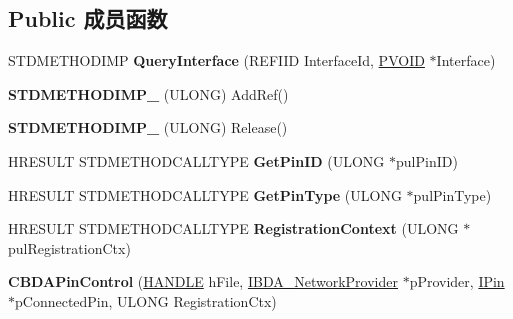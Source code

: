 \subsection*{Public 成员函数}
\begin{DoxyCompactItemize}
\item 
\mbox{\label{class_c_b_d_a_pin_control_aff80b5cf3d97cc0b25e2578de89e28e9}} 
S\+T\+D\+M\+E\+T\+H\+O\+D\+I\+MP {\bfseries Query\+Interface} (R\+E\+F\+I\+ID Interface\+Id, \hyperlink{interfacevoid}{P\+V\+O\+ID} $\ast$Interface)
\item 
\mbox{\label{class_c_b_d_a_pin_control_a70b28944fc1163c71111da1c06ee48b3}} 
{\bfseries S\+T\+D\+M\+E\+T\+H\+O\+D\+I\+M\+P\+\_\+} (U\+L\+O\+NG) Add\+Ref()
\item 
\mbox{\label{class_c_b_d_a_pin_control_abf90ae985c3b57a357bf246275255199}} 
{\bfseries S\+T\+D\+M\+E\+T\+H\+O\+D\+I\+M\+P\+\_\+} (U\+L\+O\+NG) Release()
\item 
\mbox{\label{class_c_b_d_a_pin_control_a649944dbf06356170b24adb0f022000e}} 
H\+R\+E\+S\+U\+LT S\+T\+D\+M\+E\+T\+H\+O\+D\+C\+A\+L\+L\+T\+Y\+PE {\bfseries Get\+Pin\+ID} (U\+L\+O\+NG $\ast$pul\+Pin\+ID)
\item 
\mbox{\label{class_c_b_d_a_pin_control_a21c966704d454ce015c0b261d421c156}} 
H\+R\+E\+S\+U\+LT S\+T\+D\+M\+E\+T\+H\+O\+D\+C\+A\+L\+L\+T\+Y\+PE {\bfseries Get\+Pin\+Type} (U\+L\+O\+NG $\ast$pul\+Pin\+Type)
\item 
\mbox{\label{class_c_b_d_a_pin_control_a57a8d922ece12f724ad809f1e64c7a0e}} 
H\+R\+E\+S\+U\+LT S\+T\+D\+M\+E\+T\+H\+O\+D\+C\+A\+L\+L\+T\+Y\+PE {\bfseries Registration\+Context} (U\+L\+O\+NG $\ast$pul\+Registration\+Ctx)
\item 
\mbox{\label{class_c_b_d_a_pin_control_a110388dc8190e459955b26dc650dd026}} 
{\bfseries C\+B\+D\+A\+Pin\+Control} (\hyperlink{interfacevoid}{H\+A\+N\+D\+LE} h\+File, \hyperlink{interface_i_b_d_a___network_provider}{I\+B\+D\+A\+\_\+\+Network\+Provider} $\ast$p\+Provider, \hyperlink{interface_i_pin}{I\+Pin} $\ast$p\+Connected\+Pin, U\+L\+O\+NG Registration\+Ctx)
\end{DoxyCompactItemize}
